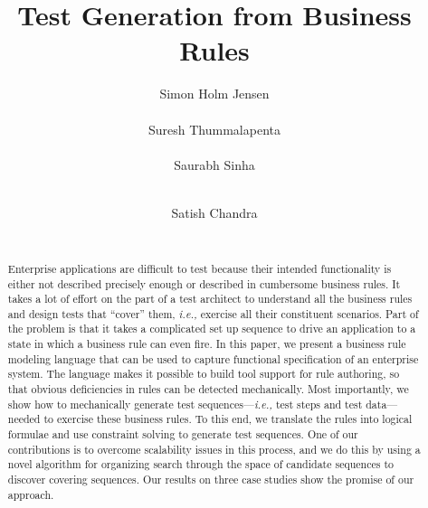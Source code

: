 \documentclass{sig-alternate}
\begin{document}
\newcommand{\ie}{\textit{i.e.,} }
\newcommand{\eg}{\textit{e.g.,} }
\newcommand{\subject}[1]{\texttt{\small #1}}
\newcommand{\rules}{{\mathcal R}}
\newcommand{\tests}{{\mathcal T}}
\newcommand{\elemexists}{\mt{exists}}
\newcommand{\elemenabled}{\mt{enabled}}
\newcommand{\elemexplored}{\mt{explored}}
\newcommand{\note}[1]{{\color{red}$[$ \bf #1 $]$}}
\newcommand{\lang}[1]{\texttt{\scriptsize #1}}
\newcommand{\tool}{\textsc{buster}}
\newcommand{\exhaust}{\textsc{exhaust}}
\newcommand{\choco}{\textsc{choco}}
\newcommand{\wateg}{\textsc{wateg}}

\title{Test Generation from Business Rules}
\author{
\alignauthor Simon Holm Jensen \\
\\
\alignauthor Suresh Thummalapenta \\
 \\
\alignauthor Saurabh Sinha \\
 \\
\and 
\alignauthor Satish Chandra \\
 \\
}

\maketitle

\begin{abstract}
Enterprise applications are difficult to test because their intended
functionality is either not described precisely enough or described in
cumbersome business rules. It takes a lot of effort on the part of a test
architect to understand all the business rules and design tests that ``cover''
them, \ie exercise all their constituent scenarios. Part of the problem is that
it takes a complicated set up sequence to drive an application to a state in
which a business rule can even fire.  In this paper, we present a business rule
modeling language that can be used to capture functional specification of an
enterprise system. The language makes it possible to build tool support for rule
authoring, so that obvious deficiencies in rules can be detected
mechanically. Most importantly, we show how to mechanically generate test
sequences---\ie test steps and test data---needed to exercise these business
rules. To this end, we translate the rules into logical formulae and use
constraint solving to generate test sequences.  One of our contributions is to
overcome scalability issues in this process, and we do this by using a novel
algorithm for organizing search through the space of candidate sequences to
discover covering sequences.  Our results on three case studies show the promise
of our approach.
\end{abstract}










\end{document}
